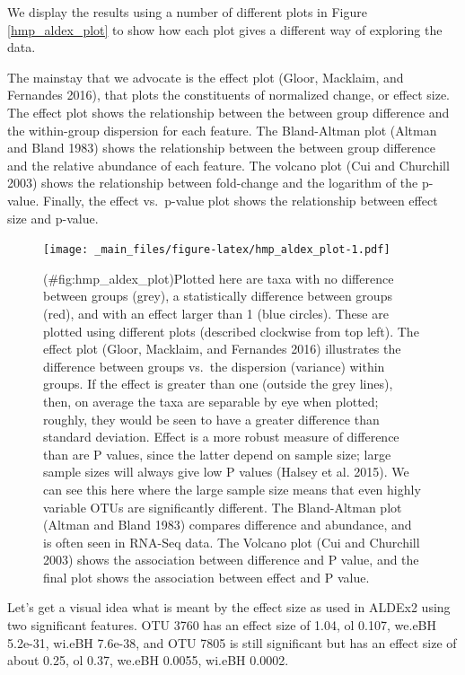 \documentclass[onecolumn]{article}
\begin{document}
We display the results using a number of different plots in Figure \ref{hmp_aldex_plot} to show how each plot gives a different way of exploring the data.

The mainstay that we advocate is the effect plot (Gloor, Macklaim, and Fernandes 2016), that plots the constituents of normalized change, or effect size. The effect plot shows the relationship between the between group difference and the within-group dispersion for each feature. The Bland-Altman plot (Altman and Bland 1983) shows the relationship between the between group difference and the relative abundance of each feature. The volcano plot (Cui and Churchill 2003) shows the relationship between fold-change and the logarithm of the p-value. Finally, the effect vs.~p-value plot shows the relationship between effect size and p-value.

\begin{figure}
\centering
\texttt{[image: \_main\_files/figure-latex/hmp\_aldex\_plot-1.pdf]}
\caption{(\#fig:hmp\_aldex\_plot)Plotted here are taxa with no difference between groups (grey), a statistically difference between groups (red), and with an effect larger than 1 (blue circles). These are plotted using different plots (described clockwise from top left). The effect plot (Gloor, Macklaim, and Fernandes 2016) illustrates the difference between groups vs.~the dispersion (variance) within groups. If the effect is greater than one (outside the grey lines), then, on average the taxa are separable by eye when plotted; roughly, they would be seen to have a greater difference than standard deviation. Effect is a more robust measure of difference than are P values, since the latter depend on sample size; large sample sizes will always give low P values (Halsey et al. 2015). We can see this here where the large sample size means that even highly variable OTUs are significantly different. The Bland-Altman plot (Altman and Bland 1983) compares difference and abundance, and is often seen in RNA-Seq data. The Volcano plot (Cui and Churchill 2003) shows the association between difference and P value, and the final plot shows the association between effect and P value.}
\end{figure}

Let's get a visual idea what is meant by the effect size as used in ALDEx2 using two significant features. OTU 3760 has an effect size of 1.04, ol 0.107, we.eBH 5.2e-31, wi.eBH 7.6e-38, and OTU 7805 is still significant but has an effect size of about 0.25, ol 0.37, we.eBH 0.0055, wi.eBH 0.0002.
\end{document}
